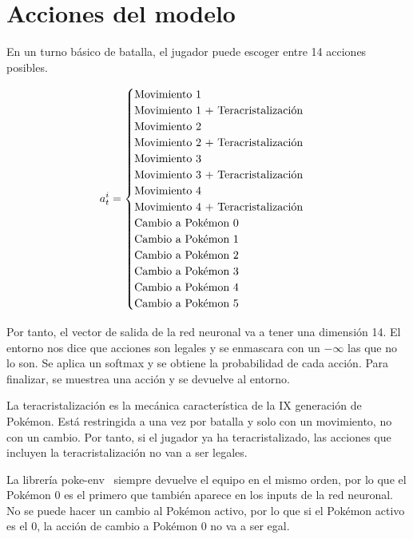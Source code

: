 \section{Acciones del modelo} \label{anexo:actions}

En un turno básico de batalla, el jugador puede escoger entre 14 acciones posibles.

\[
    a_t^i =
    \begin{cases}
        $\text{Movimiento 1}$                      \\
        $\text{Movimiento 1 + Teracristalización}$ \\
        $\text{Movimiento 2}$                      \\
        $\text{Movimiento 2 + Teracristalización}$ \\
        $\text{Movimiento 3}$                      \\
        $\text{Movimiento 3 + Teracristalización}$ \\
        $\text{Movimiento 4}$                      \\
        $\text{Movimiento 4 + Teracristalización}$ \\
        $\text{Cambio a Pokémon 0}$                \\
        $\text{Cambio a Pokémon 1}$                \\
        $\text{Cambio a Pokémon 2}$                \\
        $\text{Cambio a Pokémon 3}$                \\
        $\text{Cambio a Pokémon 4}$                \\
        $\text{Cambio a Pokémon 5}$                \\
    \end{cases}
\]

Por tanto, el vector de salida de la red neuronal va a tener una dimensión 14. El entorno nos dice que acciones son legales y se enmascara con un $-\infty$ las que no lo son. Se aplica un softmax y se obtiene la probabilidad de cada acción. Para finalizar, se muestrea una acción y se devuelve al entorno.

La teracristalización es la mecánica característica de la IX generación de Pokémon. Está restringida a una vez por batalla y solo con un movimiento, no con un cambio. Por tanto, si el jugador ya ha teracristalizado, las acciones que incluyen la teracristalización no van a ser legales.

La librería poke-env~\cite{poke_env} siempre devuelve el equipo en el mismo orden, por lo que el Pokémon 0 es el primero que también aparece en los inputs de la red neuronal. No se puede hacer un cambio al Pokémon activo, por lo que si el Pokémon activo es el 0, la acción de cambio a Pokémon 0 no va a ser egal.
